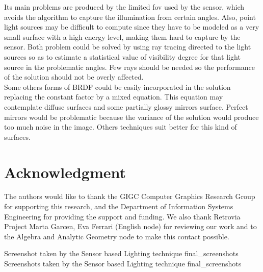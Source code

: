 \documentclass[10pt, conference]{IEEEtran}
\begin{document}
Its main problems are produced by the limited fov used by the sensor, which avoids the algorithm to capture the illumination from certain angles.
Also, point light sources may be difficult to compute since they have to be modeled as a very small surface with a high energy level, making them hard to capture by the sensor.
Both problem could be solved by using ray tracing directed to the light sources so as to estimate a statistical value of visibility degree for that light source in the problematic angles. 
Few rays should be needed so the performance of the solution should not be overly affected.\\

Some others forms of BRDF could be easily incorporated in the solution replacing the constant factor by a mixed equation. This equation may contemplate diffuse surfaces and some partially glossy mirrors surface. Perfect mirrors would be problematic because the variance of the solution would produce too much noise in the image. Others techniques suit better for this kind of surfaces.\\






\iffinal
\section*{Acknowledgment}
%
The authors would like to thank the GIGC Computer Graphics Research Group for supporting this research, and the Department of Information Systems 
Engineering for providing the support and funding. We also thank Retrovia Project Marta Garcen, Eva Ferrari (English node) for reviewing our work 
and to the Algebra and Analytic Geometry node to make this contact possible.
\fi













\subimages
	{Screenshot taken by the Sensor based Lighting technique}
	{final_screenshots}{
}
\subimages
	{Screenshots taken by the Sensor based Lighting technique}
	{final_screenshots}{
}
\end{document}
